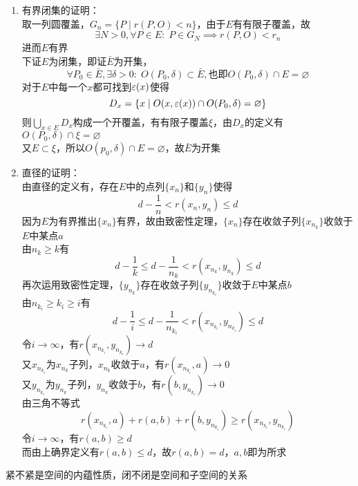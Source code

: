 \begin{analysis}
\begin{enumerate}
\item 有界闭集的证明：\\
取一列圆覆盖，$G_n=\{P\mid r(P,O)<n\}$，由于$E$有有限子覆盖，故
\[\exists N>0,\forall P\in E:\;P\in G_N\implies r(P,O)<r_n\]
进而$E$有界\\
下证$E$为闭集，即证$\bar{E}$为开集，
\[\forall P_0\in\bar{E},\exists\delta>0:\;O(P_0,\delta)\subset\bar{E},\mbox{也即}O(P_0,\delta)\cap E=\varnothing\]
对于$E$中每一个$x$都可找到$\varepsilon(x)$使得
\[D_x=\{x\mid O(x,\varepsilon(x))\cap O(P_0,\delta)=\varnothing\}\]
则$\bigcup_{x\in E}D_x$构成一个开覆盖，有有限子覆盖$\xi$，由$D_x$的定义有$O(P_0,\delta)\cap\xi=\varnothing$\\
又$E\subset\xi$，所以$O(p_0,\delta)\cap E=\varnothing$，故$\bar{E}$为开集
\item 直径的证明：\\
由直径的定义有，存在$E$中的点列$\{x_n\}$和$\{y_n\}$使得
\[d-\frac{1}{n}<r(x_n,y_n)\leq d\]
因为$E$为有界推出$\{x_n\}$有界，故由致密性定理，$\{x_n\}$存在收敛子列$\{x_{n_k}\}$收敛于$E$中某点$a$\\
由$n_k\geq k$有
\[d-\frac{1}{k}\leq d-\frac{1}{n_k}<r(x_{n_k},y_{n_k})\leq d\]
再次运用致密性定理，$\{y_{n_k}\}$存在收敛子列$\{y_{n_{k_i}}\}$收敛于$E$中某点$b$\\
由$n_{k_i}\geq k_i\geq i$有
\[d-\frac{1}{i}\leq d-\frac{1}{n_{k_i}}<r(x_{n_{k_i}},y_{n_{k_i}})\leq d\]
令$i\to\infty$，有$r(x_{n_{k_i}},y_{n_{k_i}})\to d$\\
又$x_{n_{k_i}}$为$x_{n_k}$子列，$x_{n_k}$收敛于$a$，有$r(x_{n_{k_i}},a)\to 0$\\
又$y_{n_{k_i}}$为$y_{n_k}$子列，$y_{n_k}$收敛于$b$，有$r(b,y_{n_{k_i}})\to 0$\\
由三角不等式
\[r(x_{n_{k_i}},a)+r(a,b)+r(b,y_{n_{k_i}})\geq r(x_{n_{k_i}},y_{n_{k_i}})\]
令$i\to\infty$，有$r(a,b)\geq d$\\
而由上确界定义有$r(a,b)\leq d$，故$r(a,b)=d$，$a,b$即为所求
\end{enumerate}
\end{analysis}
紧不紧是空间的内蕴性质，闭不闭是空间和子空间的关系


